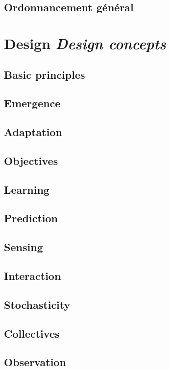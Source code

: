 \subsection{Ordonnancement général}


\section[Design -- \textit{Design concepts}]{Design \protect\newline \large{\textit{Design concepts}}}

\subsection{Basic principles}
\subsection{Emergence}
\subsection{Adaptation}
\subsection{Objectives}
\subsection{Learning}
\subsection{Prediction}
\subsection{Sensing}
\subsection{Interaction}
\subsection{Stochasticity}
\subsection{Collectives}
\subsection{Observation}


